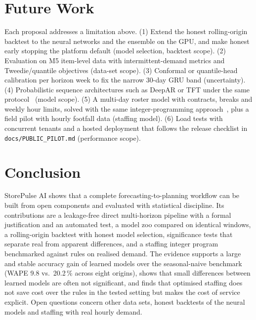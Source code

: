 \documentclass[conference]{IEEEtran}
\newcommand{\code}[1]{\texttt{\small #1}}
\begin{document}
\section{Future Work}\label{sec:future}
Each proposal addresses a limitation above. (1) Extend the honest rolling-origin backtest to the
neural networks and the ensemble on the GPU, and make honest early stopping the platform default
(model selection, backtest scope). (2) Evaluation on M5 item-level data with intermittent-demand
metrics and Tweedie/quantile objectives (data-set scope). (3) Conformal or quantile-head calibration
per horizon week to fix the narrow 30-day GRU band (uncertainty). (4) Probabilistic sequence
architectures such as DeepAR or TFT under the same protocol~\cite{salinas2020deepar,lim2021tft}
(model scope). (5) A multi-day roster model with contracts, breaks and weekly hour limits, solved
with the same integer-programming approach~\cite{ernst2004staff}, plus a field pilot with hourly
footfall data (staffing model). (6) Load tests with concurrent tenants and a hosted deployment that
follows the release checklist in \code{docs/PUBLIC\_PILOT.md} (performance scope).

\section{Conclusion}\label{sec:conclusion}
StorePulse AI shows that a complete forecasting-to-planning workflow can be built from open
components and evaluated with statistical discipline. Its contributions are a leakage-free direct
multi-horizon pipeline with a formal justification and an automated test, a model zoo compared on
identical windows, a rolling-origin backtest with honest model selection, significance tests that
separate real from apparent differences, and a staffing integer program benchmarked against rules
on realised demand. The evidence supports a large and stable accuracy gain of learned models over the
seasonal-naive benchmark (WAPE 9.8 vs.\ 20.2\,\% across eight origins), shows that small differences
between learned models are often not significant, and finds that optimised staffing does not save cost
over the rules in the tested setting but makes the cost of service explicit. Open questions concern
other data sets, honest backtests of the neural models and staffing with real hourly demand.
\end{document}
